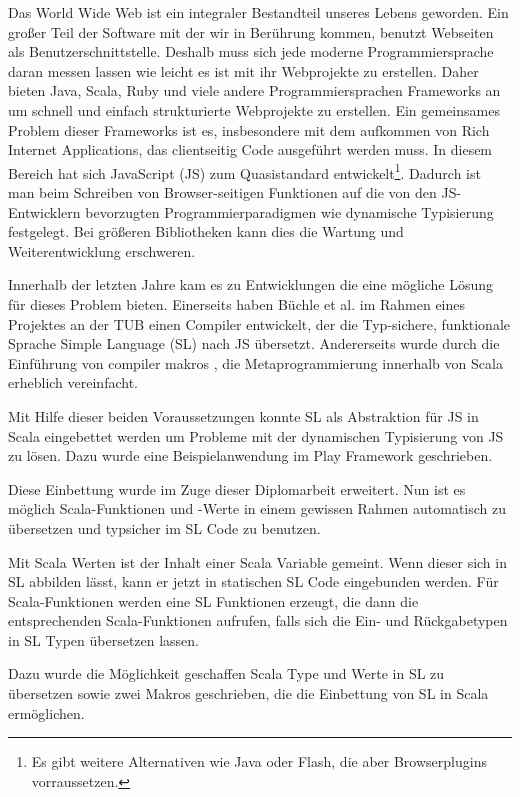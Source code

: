 \documentclass[12pt,bibtotoc]{scrreprt}
\begin{document}
Das World Wide Web ist ein integraler Bestandteil unseres Lebens geworden. Ein großer Teil der Software mit der wir in Berührung kommen, benutzt Webseiten als Benutzerschnittstelle. Deshalb muss sich jede moderne Programmiersprache daran messen lassen wie leicht es ist mit ihr Webprojekte zu erstellen. Daher bieten Java, Scala, Ruby und viele andere Programmiersprachen Frameworks an um schnell und einfach strukturierte Webprojekte zu erstellen. Ein gemeinsames Problem dieser Frameworks ist es, insbesondere mit dem aufkommen von Rich Internet Applications, das clientseitig Code ausgeführt werden muss. In diesem Bereich hat sich JavaScript (JS) zum Quasistandard entwickelt\footnote{Es gibt weitere Alternativen wie Java oder Flash, die aber Browserplugins vorraussetzen.}. Dadurch ist man beim Schreiben von Browser-seitigen Funktionen auf die von den JS-Entwicklern bevorzugten Programmierparadigmen wie dynamische Typisierung festgelegt. Bei größeren Bibliotheken kann dies die Wartung und Weiterentwicklung erschweren.

Innerhalb der letzten Jahre kam es zu Entwicklungen die eine mögliche Lösung für dieses Problem bieten. Einerseits haben Büchle et al. im Rahmen eines Projektes an der \ac{TUB} einen Compiler entwickelt, der die Typ-sichere, funktionale Sprache Simple Language (SL) nach JS übersetzt\cite{Buchle2013}. Andererseits wurde durch die Einführung von compiler makros \cite{Burmako2013}, die Metaprogrammierung innerhalb von Scala erheblich vereinfacht.

Mit Hilfe dieser beiden Voraussetzungen konnte SL als Abstraktion für JS in Scala eingebettet werden\cite{Hoger2013} um Probleme mit der dynamischen Typisierung von JS zu lösen. Dazu wurde eine Beispielanwendung im Play Framework geschrieben\cite{Play1}. 

Diese Einbettung wurde im Zuge dieser Diplomarbeit erweitert. Nun ist es  möglich Scala-Funktionen und -Werte in einem gewissen Rahmen automatisch zu übersetzen und typsicher im SL Code zu benutzen. 

Mit Scala Werten ist der Inhalt einer Scala Variable gemeint. Wenn dieser sich in SL abbilden lässt, kann er jetzt in statischen SL Code eingebunden werden. Für Scala-Funktionen werden eine SL Funktionen erzeugt, die dann die entsprechenden Scala-Funktionen aufrufen, falls sich die Ein- und Rückgabetypen in SL Typen übersetzen lassen.

Dazu wurde die Möglichkeit geschaffen Scala Type und Werte in SL zu übersetzen sowie zwei Makros geschrieben, die die Einbettung von SL in Scala ermöglichen. 
\end{document}
